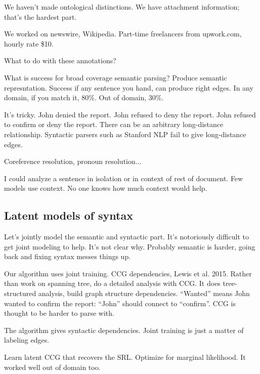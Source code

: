 We haven't made ontological distinctions. We have attachment information; that's the hardest part.

We worked on newswire, Wikipedia. Part-time freelancers from upwork.com, hourly rate \$10.



What to do with these annotations? %

What is success for broad coverage semantic parsing? Produce semantic represntation. Success if any sentence you hand, can produce right edges. In any domain, if you match it, 80\%. Out of domain, 30\%.

It's tricky. John denied the report. John refused to deny the report.  John refused to confirm or deny the report.
There can be an arbitrary long-distance relationship.
Syntactic parsers such as Stanford NLP fail to give long-distance edges.

Coreference resolution, pronoun resolution...

I could analyze a sentence in isolation or in context of rest of document. Few models use context. No one knows how much context would help.

\subsection{Latent models of syntax}

Let's jointly model the semantic and syntactic part. 
It's notoriously difficult to get joint modeling to help. It's not clear why. Probably semantic is harder, going back and fixing syntax messes things up.

Our algorithm uses joint training. 
CCG dependencies, Lewis et al. 2015. Rather than work on spanning tree, do a detailed analysis with CCG. It does tree-structured analysis, build graph structure dependencies. ``Wanted''  means 
John wanted to confirm the report: ``John'' should connect to ``confirm''. CCG is thought to be harder to parse with. 

 The algorithm gives syntactic dependencies. Joint training is just a matter of labeling edges.

Learn latent CCG that recovers the SRL. Optimize for marginal likelihood. 
It worked well out of domain too. 

